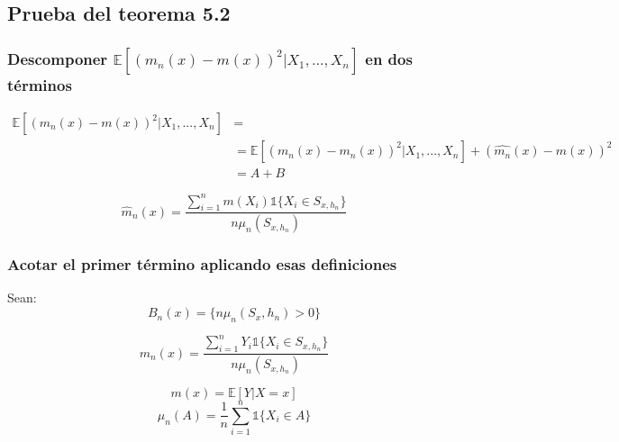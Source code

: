\documentclass[12pt, a4paper]{article}
\begin{document}
\subsection{Prueba del teorema 5.2}
\subsubsection{Descomponer $ \mathds{E}[ (m_n(x) - m(x))^2 | X_1, ..., X_n] $ en dos términos}

$$
\begin{aligned}
\mathds{E}[ (m_n(x) - m(x))^2 | X_1, ..., X_n ] &= \\
&= \mathds{E}[ (m_n(x) - \hat{m_n}(x))^2 | X_1, ..., X_n ] + (\hat{m_n}(x) - m(x))^2 \\ 
&= A + B
\end{aligned}
$$

$$
\hat{m}_n(x) = \frac{ \sum_{i=1}^{n} m(X_i) \mathds{1}\{ X_i \in S_{x,h_n} \} }{n \mu_n(S_{x,h_n})}
$$

\subsubsection{Acotar el primer término aplicando esas definiciones}

Sean:
$$
B_n(x)=\{ n \mu_n(S_x,h_n) > 0 \}
$$

$$
m_n(x)=\frac{ \sum_{i=1}^{n} Y_i \mathds{1}\{ X_i \in S_{x,h_n} \} }{n \mu_n(S_{x,h_n})}
$$

$$
m(x)=\mathds{E}[Y|X=x]
$$
$$
\mu_n(A)=\frac{1}{n}\sum_{i=1}^n \mathds{1}\{ X_i \in A \}
$$
\end{document}
